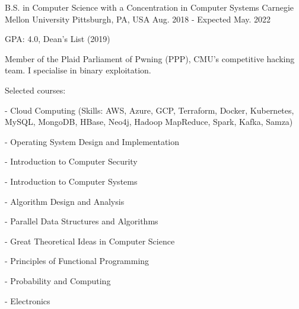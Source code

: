 

\begin{cventries}

  \cventry
    {B.S. in Computer Science with a Concentration in Computer Systems} %
    {Carnegie Mellon University} %
    {Pittsburgh, PA, USA} %
    {Aug. 2018 - Expected May. 2022} %
    {
      \begin{cvitems} %
      \item {GPA: 4.0, Dean's List (2019)}
      \item {Member of the Plaid Parliament of Pwning (PPP), CMU's competitive hacking team. I specialise in binary exploitation.}
      \item {Selected courses:}
      \item[-] {Cloud Computing (Skills: AWS, Azure, GCP, Terraform, Docker, Kubernetes, MySQL, MongoDB, HBase, Neo4j, Hadoop MapReduce, Spark, Kafka, Samza)}
        \setlength\multicolsep{0pt}
        \begin{multicols}{2}
          \item[-] {Operating System Design and Implementation}
          \item[-] {Introduction to Computer Security}
          \item[-] {Introduction to Computer Systems}
          \item[-] {Algorithm Design and Analysis}
          \item[-] {Parallel Data Structures and Algorithms}
          \item[-] {Great Theoretical Ideas in Computer Science}
          \item[-] {Principles of Functional Programming}
          \item[-] {Probability and Computing}
          \item[-] {Electronics}
        \end{multicols}
      \end{cvitems}
    }
\end{cventries}
